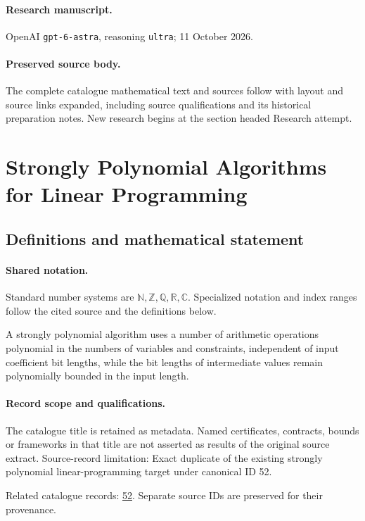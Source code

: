 \documentclass[11pt]{article}
\begin{document}
\paragraph{Research manuscript.} OpenAI \texttt{gpt-6-astra}, reasoning \texttt{ultra}; 11 October 2026.
\paragraph{Preserved source body.} The complete catalogue mathematical text and sources follow with layout and source links expanded, including source qualifications and its historical preparation notes. New research begins at the section headed Research attempt.

\section{Strongly Polynomial Algorithms for Linear Programming}\label{statement}

\subsection{Definitions and mathematical statement}

\paragraph{Shared notation.}Standard number systems are $\mathbb N,\mathbb Z,\mathbb Q,\mathbb R,\mathbb C$. Specialized notation and index ranges follow the cited source and the definitions below.


A strongly polynomial algorithm uses a number of arithmetic operations polynomial in the numbers of variables and constraints, independent of input coefficient bit lengths, while the bit lengths of intermediate values remain polynomially bounded in the input length.
\paragraph{Record scope and qualifications.}
The catalogue title is retained as metadata. Named certificates, contracts, bounds or frameworks in that title are not asserted as results of the original source extract.
Source-record limitation: Exact duplicate of the existing strongly polynomial linear-programming target under canonical ID 52.

Related catalogue records: \href{https://mehmetmars7.github.io/Erdosproblems-llm-hunter/problem.html?type=open_problems&id=52}{52}. Separate source IDs are preserved for their provenance.
\end{document}

